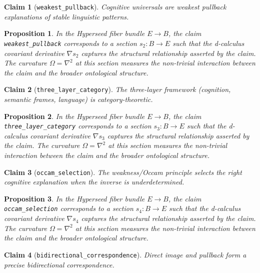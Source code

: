 \documentclass{article}
\newtheorem{claim}{Claim}
\newtheorem{proposition}{Proposition}
\begin{document}
\begin{claim}[\texttt{weakest_pullback}]
Cognitive universals are weakest pullback explanations of stable linguistic patterns.
\end{claim}

\begin{proposition}
In the Hyperseed fiber bundle $E \to B$, the claim \texttt{weakest_pullback} corresponds to a section $s_2: B \to E$ such that the d-calculus covariant derivative $\nabla s_2$ captures the structural relationship asserted by the claim. The curvature $\Omega = \nabla^2$ at this section measures the non-trivial interaction between the claim and the broader ontological structure.
\end{proposition}

\begin{claim}[\texttt{three_layer_category}]
The three-layer framework (cognition, semantic frames, language) is category-theoretic.
\end{claim}

\begin{proposition}
In the Hyperseed fiber bundle $E \to B$, the claim \texttt{three_layer_category} corresponds to a section $s_3: B \to E$ such that the d-calculus covariant derivative $\nabla s_3$ captures the structural relationship asserted by the claim. The curvature $\Omega = \nabla^2$ at this section measures the non-trivial interaction between the claim and the broader ontological structure.
\end{proposition}

\begin{claim}[\texttt{occam_selection}]
The weakness/Occam principle selects the right cognitive explanation when the inverse is underdetermined.
\end{claim}

\begin{proposition}
In the Hyperseed fiber bundle $E \to B$, the claim \texttt{occam_selection} corresponds to a section $s_4: B \to E$ such that the d-calculus covariant derivative $\nabla s_4$ captures the structural relationship asserted by the claim. The curvature $\Omega = \nabla^2$ at this section measures the non-trivial interaction between the claim and the broader ontological structure.
\end{proposition}

\begin{claim}[\texttt{bidirectional_correspondence}]
Direct image and pullback form a precise bidirectional correspondence.
\end{claim}
\end{document}
